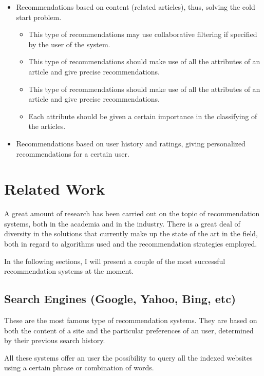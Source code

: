 \begin{itemize}
  \item Recommendations based on content (related articles), thus, solving the cold start problem.
  \begin{itemize}
    \item This type of recommendations may use collaborative filtering if specified by the user of the system.
    \item This type of recommendations should make use of all the attributes of an article and give precise recommendations.
    \item This type of recommendations should make use of all the attributes of an article and give precise recommendations.
    \item Each attribute should be given a certain importance in the classifying of the articles.
  \end{itemize}
  \item Recommendations based on user history and ratings, giving personalized recommendations for a certain user.
\end{itemize}



\section{Related Work}
\label{sub-sec:related-work}

A great amount of research has been carried out on the topic of recommendation systems, both in the academia and in the industry. There is a great deal of diversity in the solutions that currently make up the state of the art in the field, both in regard to algorithms used and the recommendation strategies employed. 

In the following sections, I will present a couple of the most successful recommendation systems at the moment.
\nocite{*}

\subsection{Search Engines (Google, Yahoo, Bing, etc)}

These are the most famous type of recommendation systems. They are based on both the content of a site and the particular preferences of an user, determined by their previous search history. 

All these systems offer an user the possibility to query all the indexed websites using a certain phrase or combination of words.

